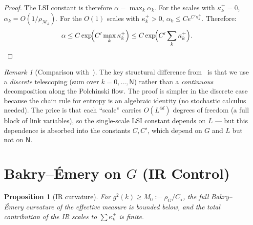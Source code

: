 \documentclass[11pt,a4paper]{article}
\theoremstyle{plain}
\newtheorem{proposition}[theorem]{Proposition}
\theoremstyle{definition}
\theoremstyle{remark}
\newtheorem{remark}[theorem]{Remark}
\newcommand{\cM}{\mathcal{M}}
\begin{document}
\begin{proof}
The LSI constant is therefore
$\alpha = \max_k \alpha_k$. For the scales with
$\kappa_k^+ = 0$, $\alpha_k = O(1/\rho_{\cM_k})$.
For the $O(1)$ scales with $\kappa_k^+ > 0$,
$\alpha_k \le C e^{C'\kappa_k^+}$. Therefore:
\begin{equation}
  \alpha \le C \exp\!\Bigl(C'\max_k \kappa_k^+\Bigr)
  \le C \exp\!\Bigl(C'\sum_k \kappa_k^+\Bigr).
  \qedhere
\end{equation}
\end{proof}

\begin{remark}[Comparison with~\cite{BBD24}]
The key structural difference from~\cite{BBD24} is
that we use a \emph{discrete} telescoping
(sum over $k = 0, \ldots, \mathsf{N}$) rather than a
\emph{continuous} decomposition along the Polchinski flow.
The proof is simpler in the discrete case because the
chain rule for entropy is an algebraic identity
(no stochastic calculus needed). The price is that each
``scale'' carries $O(L^{4d})$ degrees of freedom (a full
block of link variables), so the single-scale LSI constant
depends on $L$ --- but this dependence is absorbed into
the constants $C, C'$, which depend on $G$ and $L$ but
not on $\mathsf{N}$.
\end{remark}

\section{Bakry--\'Emery on $G$ (IR Control)}
\label{sec:be}

\begin{proposition}[IR curvature]\label{prop:IR}
For $g^2(k) \ge M_0 := \rho_G / C_\star$, the full
Bakry--\'Emery curvature of the effective measure is
bounded below, and the total contribution of the IR
scales to $\sum\kappa_k^+$ is finite.
\end{proposition}
\end{document}
